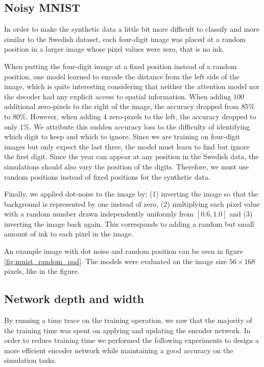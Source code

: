 \subsection{Noisy MNIST}

In order to make the synthetic data a little bit more difficult to classify and more similar to the Swedish dataset, each four-digit image was placed at a random position in a larger image whose pixel values were zero, that is no ink.

When putting the four-digit image at a fixed position instead of a random position, one model learned to encode the distance from the left side of the image, which is quite interesting considering that neither the attention model nor the decoder had any explicit access to spatial information.
When adding $100$ additional zero-pixels to the right of the image, the accuracy dropped from $85\%$ to $80\%$. However, when adding $4$ zero-pixels to the left, the accuracy dropped to only $1\%$. We attribute this sudden accuracy loss to the difficulty of identifying which digit to keep and which to ignore. Since we are training on four-digit images but only expect the last three, the model must learn to find but ignore the first digit.
Since the year can appear at any position in the Swedish data, the simulations should also vary the position of the digits. Therefore, we must use random positions instead of fixed positions for the synthetic data.

Finally, we applied dot-noise to the image by:
(1) inverting the image so that the background is represented by one instead of zero,
(2) multiplying each pixel value with a random number drawn independently uniformly from $[0.6, 1.0]$ and
(3) inverting the image back again.
This corresponds to adding a random but small amount of ink to each pixel in the image.

An example image with dot noise and random position can be seen in figure \ref{fig:mnist_random_pad}. The models were evaluated on the image size $56 \times 168$ pixels, like in the figure.


\subsection{Network depth and width} \label{sssec:exp_encoder}

By running a time trace on the training operation, we saw that the majority of the training time was spent on applying and updating the encoder network. In order to reduce training time we performed the following experiments to design a more efficient encoder network while maintaining a good accuracy on the simulation tasks.

